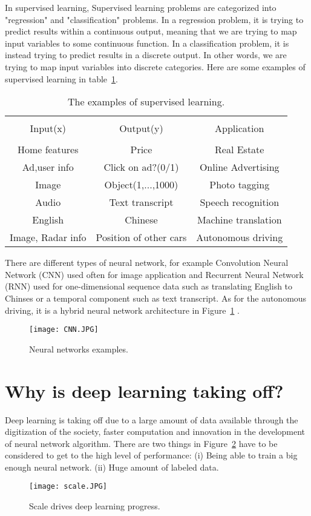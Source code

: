 \documentclass[a4paper]{article}
\begin{document}
In supervised learning, Supervised learning problems are categorized into "regression" and "classification" problems. In a regression problem, it is trying to predict results within a continuous output, meaning that we are trying to map input variables to some continuous function. In a classification problem, it is instead trying to predict results in a discrete output. In other words, we are trying to map input variables into discrete categories. Here are some examples of supervised learning in table~\ref{tab:result}.
\begin{table}[hb]
    \centering
    \begin{tabular}{ccc}
        \hline \\
        Input(x) & Output(y) & Application \\
        \hline \\
        Home features & Price& Real Estate \\
        Ad,user info&Click on ad?(0/1)&Online Advertising\\
        Image& Object(1,...,1000)& Photo tagging\\
        Audio&Text transcript&Speech recognition\\
        English &Chinese &Machine translation\\
        Image, Radar info&Position of other cars&Autonomous driving\\
        \hline
    \end{tabular}
    \caption{ The examples of supervised learning.}
    \label{tab:result}
\end{table}
There are different types of neural network, for example Convolution Neural Network (CNN) used often for image application and Recurrent Neural Network (RNN) used for one-dimensional sequence data such as translating English to Chinses or a temporal component such as text transcript. As for the autonomous driving, it is a hybrid neural network architecture in Figure~\ref{fig:three} .
\begin{figure}[hb]
    \centering
    \texttt{[image: CNN.JPG]}
    \caption{Neural networks examples.}
    \label{fig:three}
\end{figure}
\section{Why is deep learning taking off?}
Deep learning is taking off due to a large amount of data available through the digitization of the society, faster computation and innovation in the development of neural network algorithm. There are two things in Figure~\ref{fig:two} have to be considered to get to the high level of performance: (i) Being able to train a big enough neural network. (ii) Huge amount of labeled data.
\begin{figure}[H]
    \centering
    \texttt{[image: scale.JPG]}
    \caption{Scale drives deep learning progress.}
    \label{fig:two}
\end{figure}
\end{document}
